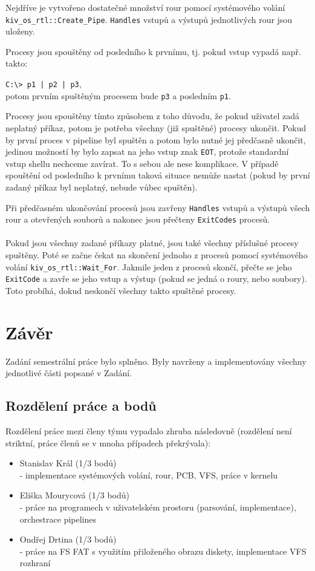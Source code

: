 \documentclass[12pt, a4paper]{article}
\let\oldsection\section
\renewcommand\section{\clearpage\oldsection}
\begin{document}
	Nejdříve je vytvořeno dostatečné množství rour pomocí systémového volání \texttt{kiv\_os\_rtl::Create\_Pipe}. \texttt{Handles} vstupů a výstupů jednotlivých rour jsou uloženy.	
	
	Procesy jsou spouštěny od posledního k prvnímu, tj. pokud vstup vypadá např. takto:
	
	\texttt{C:\textbackslash> p1 | p2 | p3},\\
	potom prvním spuštěným procesem bude \texttt{p3} a posledním \texttt{p1}.
	
	Procesy jsou spouštěny tímto způsobem z toho důvodu, že pokud uživatel zadá neplatný příkaz, potom je potřeba všechny (již spuštěné) procesy ukončit. Pokud by první proces v pipeline byl spuštěn a potom bylo nutné jej předčasně ukončit, jedinou možností by bylo zapsat na jeho vstup znak \texttt{EOT}, protože standardní vstup shellu nechceme zavírat. To s sebou ale nese komplikace. V případě spouštění od posledního k prvnímu taková situace nemůže nastat (pokud by první zadaný příkaz byl neplatný, nebude vůbec spuštěn).
	
	Při předčasném ukončování procesů jsou zavřeny \texttt{Handles} vstupů a výstupů všech rour a otevřených souborů a nakonec jsou přečteny \texttt{ExitCodes} procesů.
	\\
	\\
	Pokud jsou všechny zadané příkazy platné, jsou také všechny příslušné procesy spuštěny. Poté se začne čekat na skončení jednoho z procesů pomocí systémového volání \texttt{kiv\_os\_rtl::Wait\_For}. Jakmile jeden z procesů skončí, přečte se jeho \texttt{ExitCode} a zavře se jeho vstup a výstup (pokud se jedná o roury, nebo soubory). Toto probíhá, dokud neskončí všechny takto spuštěné procesy.





\section{Závěr}	

Zadání semestrální práce bylo splněno. Byly navrženy a implementovány všechny jednotlivé části popsané v Zadání.
 

\subsection{Rozdělení práce a bodů}

Rozdělení práce mezi členy týmu vypadalo zhruba následovně (rozdělení není striktní, práce členů se v mnoha případech překrývala):

\begin{itemize}
	\item Stanislav Král (1/3 bodů)\\
		- implementace systémových volání, rour, PCB, VFS, práce v kernelu
	\item Eliška Mourycová (1/3 bodů) \\
		- práce na programech v uživatelském prostoru (parsování, implementace), orchestrace pipelines
	\item Ondřej Drtina (1/3 bodů) \\
		- práce na FS FAT s využitím přiloženého obrazu diskety, implementace VFS rozhraní
\end{itemize}
\end{document}
